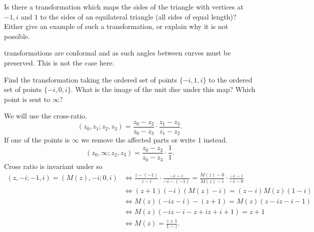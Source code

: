 \documentclass[10pt, a4paper]{article}
\begin{document}
\begin{problem}
    Is there a \mobius transformation which maps the sides of the triangle with vertices at $-1, i$ and $1$ to the sides of an equilateral triangle
    (all sides of equal length)?
    Either give an example of such a \mobius transformation,
    or explain why it is not possible.

    \begin{solution}
        \mobius transformations are conformal and as such angles between curves must be preserved.
        This is not the case here.
    \end{solution}
\end{problem}

\begin{problem}
    Find the \mobius transformation taking the ordered set of points $\{-i, 1, i\}$ to the ordered set of points $\{-i, 0, i\}$.
    What is the image of the unit disc under this map?
    Which point is sent to $\infty$?

    \begin{solution}
        We will use the cross-ratio.
        \[
        (z_0, z_1; z_2, z_3) = \frac{z_0 - z_2}{z_0 - z_3}\cdot \frac{z_1 - z_3}{z_1 - z_2}.
        \]
        If one of the points is $\infty$ we remove the affected parts or write $1$ instead.
        \[
        (z_0, \infty; z_2, z_3) = \frac{z_0 - z_2}{z_0 - z_3}\cdot \frac{1}{1}.
        \]
        Cross ratio is invariant under \mobius so
        \begin{align*}
            (z, -i; -1, i) = (M(z), -i; 0, i) &\iff \frac{z - (-1)}{z - i}\cdot\frac{-i - i}{-i - (-1)} = \frac{M(z) - 0}{M(z) - i}\cdot \frac{-i - i}{-i - 0} \\
            &\iff (z + 1)(-i)(M(z) - i) = (z - i)M(z)(1 - i) \\
            &\iff M(z)(-iz - i) - (z + 1) = M(z)(z - iz - i - 1) \\
            &\iff M(z)(-iz - i - z + iz + i + 1) = z +  1 \\
            &\iff M(z) = \frac{z + 1}{1 - z}.
        \end{align*}
    \end{solution}
\end{problem}
\end{document}
